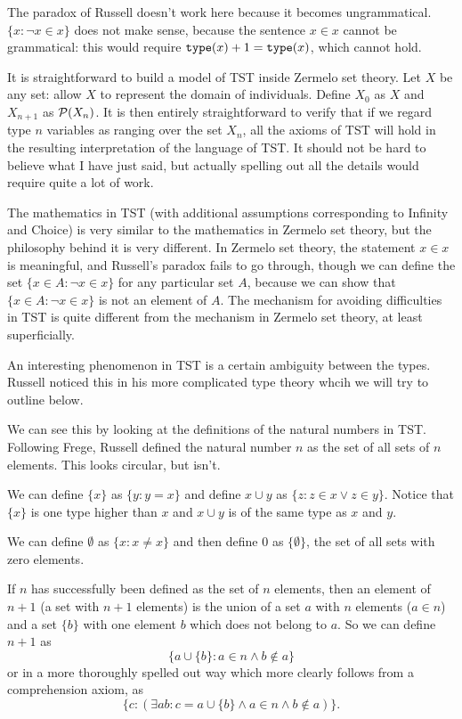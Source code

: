 \documentclass[12pt]{article}
\begin{document}
The paradox of Russell doesn't work here because it becomes ungrammatical.  $\{x : \neg x \in x\}$ does not make sense, because the sentence $x \in x$ cannot be grammatical:  this would require ${\tt type}(x)+1 = {\tt type}(x)$, which cannot hold.

It is straightforward to build a model of TST inside Zermelo set theory.  Let $X$ be any set:  allow $X$ to represent the domain of individuals.  Define $X_0$ as $X$ and
$X_{n+1}$ as ${\cal P}(X_n)$.  It is then entirely straightforward to verify that if we regard type $n$ variables as ranging over the set $X_n$, all the axioms of 
TST will hold in the resulting interpretation of the language of TST.  It should not be hard to believe what I have just said, but actually spelling out all the details would require quite a lot of work.

The mathematics in TST (with additional assumptions corresponding to Infinity and Choice) is very similar to the mathematics in Zermelo set theory, but the philosophy behind it is very different.
In Zermelo set theory, the statement $x \in x$ is meaningful, and Russell's paradox fails to go through, though we can define the set $\{x \in A:\neg x \in x\}$ for any particular set $A$, because we can show that $\{x \in A:\neg x \in x\}$ is not an element of $A$.  The mechanism for avoiding difficulties in TST is quite different from the mechanism in Zermelo set theory, at least superficially.

An interesting phenomenon in TST is a certain ambiguity between the types.  Russell noticed this in his more complicated type theory whcih we will try to outline below.

We can see this by looking at the definitions of the natural numbers in TST.  Following Frege, Russell defined the natural number $n$ as the set of all sets of $n$ elements.  This looks circular, but isn't.

We can define $\{x\}$ as $\{y:y=x\}$ and define $x \cup y$ as $\{z : z \in x \vee z \in y\}$.  Notice that $\{x\}$ is one type higher than $x$ and $x \cup y$ is of the same type as $x$ and $y$.

We can define $\emptyset$ as $\{x : x\neq x\}$ and then define 0 as $\{\emptyset\}$, the set of all sets with zero elements.

If $n$ has successfully been defined as the set of $n$ elements, then an element of $n+1$ (a set with $n+1$ elements) is the union of a set $a$ with $n$ elements ($a \in n$)
and a  set $\{b\}$ with one element $b$ which does not belong to $a$.  So we can define $n+1$ as $$\{a \cup \{b\}:a \in n \wedge b \not\in a\}$$ or in a more thoroughly spelled out way which more clearly follows from a comprehension axiom, as $$\{c : (\exists ab:c = a \cup \{b\} \wedge a \in n \wedge b \not\in a)\}.$$
\end{document}
